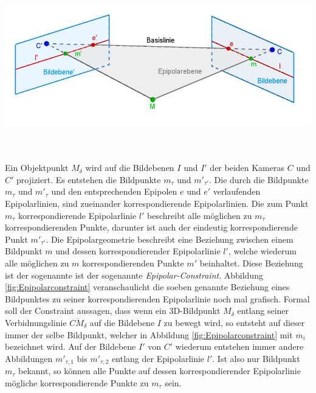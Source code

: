 \begin{minipage}{\linewidth}
	\centering
	\includegraphics[width=.8\linewidth]{images/EpipolarGeoemtrieGrafik.png}
	\label{fig:Epipolargeometry}
\end{minipage}\\ \\

Ein Objektpunkt $M_\delta$ wird auf die Bildebenen $I$ und $I'$ der beiden Kameras $C$ und $C'$ projiziert. Es entstehen die Bildpunkte $m_\tau$ und $m'_{\tau'}$. Die durch die Bildpunkte $m_\tau$ und $m'_{\tau}$ und den entsprechenden Epipolen $e$ und $e'$ verlaufenden Epipolarlinien, sind zueinander korrespondierende Epipolarlinien. Die zum Punkt $m_\tau$ korrespondierende Epipolarlinie $l'$ beschreibt alle möglichen zu $m_\tau$ korrespondierenden Punkte, darunter ist auch der eindeutig korrespondierende Punkt $m'_{\tau'}$. Die Epipolargeometrie beschreibt eine Beziehung zwischen einem Bildpunkt $m$ und dessen korrespondierender Epipolarlinie $l'$, welche wiederum alle möglichen zu $m$ korrespondierenden Punkte $m'$ beinhaltet. Diese Beziehung ist der sogenannte ist der sogenannte \textit{Epipolar-Constraint}\cite{HZ,Zhang2014,ZZGXr}. Abbildung \ref{fig:Epipolarconstraint} veranschaulicht die soeben genannte Beziehung eines Bildpunktes zu seiner korrespondierenden Epipolarlinie noch mal grafisch. Formal soll der Constraint aussagen, dass wenn ein 3D-Bildpunkt $M_\delta$ entlang seiner Verbidnungslinie $\overline{CM_\delta}$ auf die Bildebene $I$ zu bewegt wird, so entsteht auf dieser immer der selbe Bildpunkt, welcher in Abbildung \ref{fig:Epipolarconstraint} mit $m_i$ bezeichnet wird. Auf der Bildebene $I'$ von $C'$ wiederum entstehen immer andere Abbildungen $m'_{\tau,1}$ bis $m'_{\tau,2}$ entlang der Epipolarlinie $l'$. Ist also nur Bildpunkt $m_\tau$ bekannt, so können alle Punkte auf dessen korrespondierender Epipolarlinie mögliche korrespondierende Punkte zu $m_\tau$ sein.

